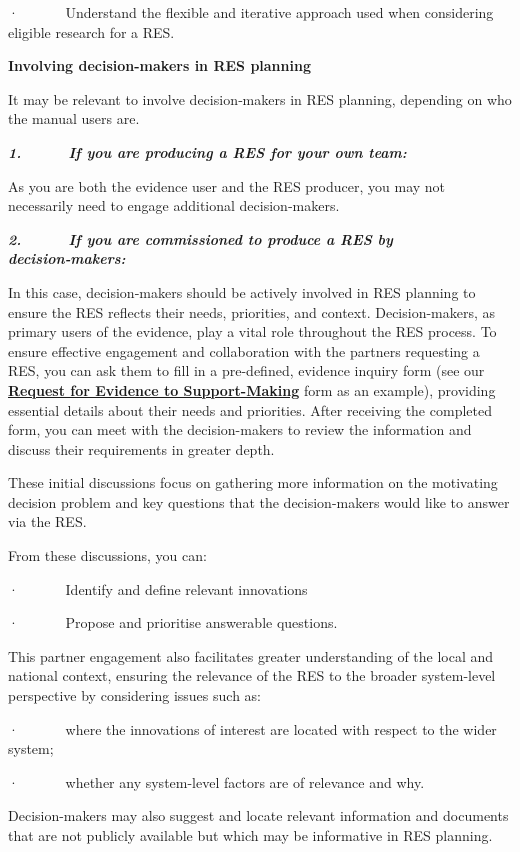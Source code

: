 \documentclass[
  letterpaper,
  DIV=11,
  numbers=noendperiod]{scrreprt}
\begin{document}
·~~~~~~ Understand the flexible and iterative approach used when
considering eligible research for a RES.

\textbf{Involving decision-makers in RES planning}

It may be relevant to involve decision‑makers in RES planning, depending
on who the manual users are.

\textbf{\emph{1.~~~~~ If you are producing a RES for your own team:}}

As you are both the evidence user and the RES producer, you may not
necessarily need to engage additional decision‑makers.

\textbf{\emph{2.~~~~~ If you are commissioned to produce a RES by
decision‑makers:}}

In this case, decision‑makers should be actively involved in RES
planning to ensure the RES reflects their needs, priorities, and
context. Decision-makers, as primary users of the evidence, play a vital
role throughout the RES process. To ensure effective engagement and
collaboration with the partners requesting a RES, you can ask them to
fill in a pre-defined, evidence inquiry form (see our
\href{https://docs.google.com/forms/d/e/1FAIpQLSdYXNkcMp96FyfGnpNq2fGGdlUPSk2Cq8nX8fAZ5y0oyCfFaA/viewform}{\textbf{Request
for Evidence to Support-Making}} form as an example), providing
essential details about their needs and priorities. After receiving the
completed form, you can meet with the decision-makers to review the
information and discuss their requirements in greater depth.

These initial discussions focus on gathering more information on the
motivating decision problem and key questions that the decision-makers
would like to answer via the RES.

From these discussions, you can:

·~~~~~~ Identify and define relevant innovations

·~~~~~~ Propose and prioritise answerable questions. ~

This partner engagement also facilitates greater understanding of the
local and national context, ensuring the relevance of the RES to the
broader system-level perspective by considering issues such as:

·~~~~~~ where the innovations of interest are located with respect to
the wider system;

·~~~~~~ whether any system-level factors are of relevance and why.

Decision-makers may also suggest and locate relevant information and
documents that are not publicly available but which may be informative
in RES planning.
\end{document}
